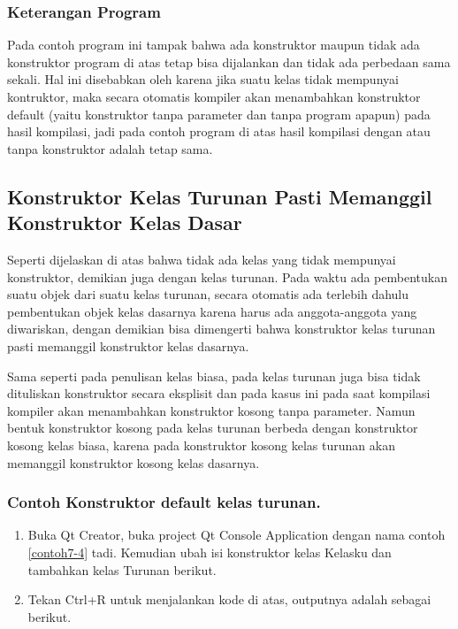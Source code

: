 \subsubsection*{Keterangan Program}

Pada contoh program ini tampak bahwa ada konstruktor maupun tidak ada
konstruktor program di atas tetap bisa dijalankan dan tidak ada
perbedaan sama sekali. Hal ini disebabkan oleh karena jika suatu kelas
tidak mempunyai kontruktor, maka secara otomatis kompiler akan
menambahkan konstruktor default (yaitu konstruktor tanpa parameter dan
tanpa program apapun) pada hasil kompilasi, jadi pada contoh program di
atas hasil kompilasi dengan atau tanpa konstruktor adalah tetap sama.

\subsection{Konstruktor Kelas Turunan Pasti Memanggil Konstruktor Kelas Dasar}\label{konstruktor-kelas-turunan-pasti-memanggil-konstruktor-kelas-dasar}

Seperti dijelaskan di atas bahwa tidak ada kelas yang tidak mempunyai
konstruktor, demikian juga dengan kelas turunan. Pada waktu ada
pembentukan suatu objek dari suatu kelas turunan, secara otomatis ada
terlebih dahulu pembentukan objek kelas dasarnya karena harus ada
anggota-anggota yang diwariskan, dengan demikian bisa dimengerti bahwa
konstruktor kelas turunan pasti memanggil konstruktor kelas dasarnya.

Sama seperti pada penulisan kelas biasa, pada kelas turunan juga bisa
tidak dituliskan konstruktor secara eksplisit dan pada kasus ini pada
saat kompilasi kompiler akan menambahkan konstruktor kosong tanpa
parameter. Namun bentuk konstruktor kosong pada kelas turunan berbeda
dengan konstruktor kosong kelas biasa, karena pada konstruktor kosong
kelas turunan akan memanggil konstruktor kosong kelas dasarnya.

\subsubsection*{Contoh Konstruktor default kelas turunan.}

\begin{enumerate}

\item
 Buka Qt Creator, buka project Qt Console Application dengan nama
 contoh \ref{contoh7-4} tadi. Kemudian ubah isi konstruktor kelas Kelasku dan
 tambahkan kelas Turunan berikut.




\item
 Tekan Ctrl+R untuk menjalankan kode di atas, outputnya adalah sebagai
 berikut.
\end{enumerate}

